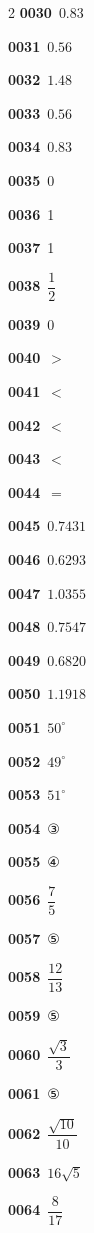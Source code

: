 \documentclass[10pt,a4paper]{article}
\begin{document}
\begin{multicols}{2}
\noindent\textbf{0030}\ $0.83$\par
\noindent\textbf{0031}\ $0.56$\par
\noindent\textbf{0032}\ $1.48$\par
\noindent\textbf{0033}\ $0.56$\par
\noindent\textbf{0034}\ $0.83$\par
\noindent\textbf{0035}\ 0\par
\noindent\textbf{0036}\ 1\par
\noindent\textbf{0037}\ 1\par
\noindent\textbf{0038}\ $\dfrac{1}{2}$\par
\noindent\textbf{0039}\ 0\par
\noindent\textbf{0040}\ $>$\par
\noindent\textbf{0041}\ $<$\par
\noindent\textbf{0042}\ $<$\par
\noindent\textbf{0043}\ $<$\par
\noindent\textbf{0044}\ $=$\par
\noindent\textbf{0045}\ $0.7431$\par
\noindent\textbf{0046}\ $0.6293$\par
\noindent\textbf{0047}\ $1.0355$\par
\noindent\textbf{0048}\ $0.7547$\par
\noindent\textbf{0049}\ $0.6820$\par
\noindent\textbf{0050}\ $1.1918$\par
\noindent\textbf{0051}\ $50^\circ$\par
\noindent\textbf{0052}\ $49^\circ$\par
\noindent\textbf{0053}\ $51^\circ$\par
\noindent\textbf{0054}\ ③\par
\noindent\textbf{0055}\ ④\par
\noindent\textbf{0056}\ $\dfrac{7}{5}$\par
\noindent\textbf{0057}\ ⑤\par
\noindent\textbf{0058}\ $\dfrac{12}{13}$\par
\noindent\textbf{0059}\ ⑤\par
\noindent\textbf{0060}\ $\dfrac{\sqrt{3}}{3}$\par
\noindent\textbf{0061}\ ⑤\par
\noindent\textbf{0062}\ $\dfrac{\sqrt{10}}{10}$\par
\noindent\textbf{0063}\ $16\sqrt{5}$\par
\noindent\textbf{0064}\ $\dfrac{8}{17}$\par

\end{multicols}
\end{document}
